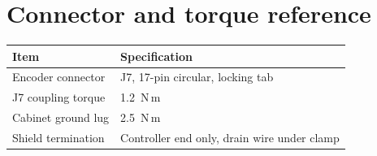 \documentclass[11pt,a4paper]{article}
\begin{document}
\section{Connector and torque reference}
\begin{table}[h]
\centering
\begin{tabular}{ll}
\toprule
Item & Specification \\
\midrule
Encoder connector & J7, 17-pin circular, locking tab \\
J7 coupling torque & 1.2~N\,m \\
Cabinet ground lug & 2.5~N\,m \\
Shield termination & Controller end only, drain wire under clamp \\
\bottomrule
\end{tabular}
\end{table}
\end{document}
